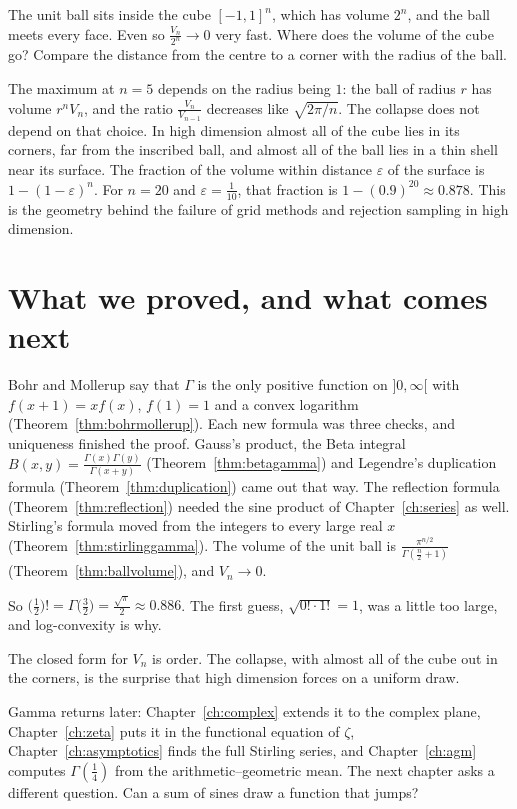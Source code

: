 \begin{think}
The unit ball sits inside the cube $[-1,1]^n$, which has volume $2^n$, and the ball meets every face. Even so $\frac{V_n}{2^n}\to0$ very fast. Where does the volume of the cube go? Compare the distance from the centre to a corner with the radius of the ball.
\end{think}

The maximum at $n=5$ depends on the radius being $1$: the ball of radius $r$ has volume $r^nV_n$, and the ratio $\frac{V_n}{V_{n-1}}$ decreases like $\sqrt{2\pi/n}$. The collapse does not depend on that choice. In high dimension almost all of the cube lies in its corners, far from the inscribed ball, and almost all of the ball lies in a thin shell near its surface. The fraction of the volume within distance $\varepsilon$ of the surface is $1-(1-\varepsilon)^n$. For $n=20$ and $\varepsilon=\frac1{10}$, that fraction is $1-(0.9)^{20}\approx0.878$. This is the geometry behind the failure of grid methods and rejection sampling in high dimension.

\section{What we proved, and what comes next}

Bohr and Mollerup say that $\Gamma$ is the only positive function on $]0,\infty[$ with $f(x+1)=xf(x)$, $f(1)=1$ and a convex logarithm (Theorem~\ref{thm:bohrmollerup}). Each new formula was three checks, and uniqueness finished the proof. Gauss's product, the Beta integral $B(x,y)=\frac{\Gamma(x)\Gamma(y)}{\Gamma(x+y)}$ (Theorem~\ref{thm:betagamma}) and Legendre's duplication formula (Theorem~\ref{thm:duplication}) came out that way. The reflection formula (Theorem~\ref{thm:reflection}) needed the sine product of Chapter~\ref{ch:series} as well. Stirling's formula moved from the integers to every large real $x$ (Theorem~\ref{thm:stirlinggamma}). The volume of the unit ball is $\frac{\pi^{n/2}}{\Gamma(\frac n2+1)}$ (Theorem~\ref{thm:ballvolume}), and $V_n\to0$.

So $\bigl(\frac12\bigr)!=\Gamma\bigl(\frac32\bigr)=\frac{\sqrt\pi}2\approx0.886$. The first guess, $\sqrt{0!\cdot1!}=1$, was a little too large, and log-convexity is why.

The closed form for $V_n$ is order. The collapse, with almost all of the cube out in the corners, is the surprise that high dimension forces on a uniform draw.

Gamma returns later: Chapter~\ref{ch:complex} extends it to the complex plane, Chapter~\ref{ch:zeta} puts it in the functional equation of $\zeta$, Chapter~\ref{ch:asymptotics} finds the full Stirling series, and Chapter~\ref{ch:agm} computes $\Gamma(\frac14)$ from the arithmetic--geometric mean. The next chapter asks a different question. Can a sum of sines draw a function that jumps?
